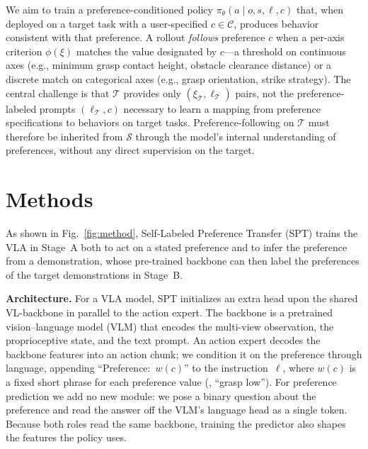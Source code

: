 \documentclass{article}
\begin{document}
We aim to train a preference-conditioned policy $\pi_{\theta}(a\mid o,s,\ell,c)$ that, when deployed on a target task with a user-specified $c\in\mathcal{C}$, produces behavior consistent with that preference.
A rollout \emph{follows} preference $c$ when a per-axis criterion $\phi(\xi)$ matches the value designated by $c$---a threshold on continuous axes (e.g., minimum grasp contact height, obstacle clearance distance) or a discrete match on categorical axes (e.g., grasp orientation, strike strategy).
The central challenge is that $\mathcal{T}$ provides only $(\xi_\mathcal{T},\ell_\mathcal{T})$ pairs, not the preference-labeled prompts $(\ell_\mathcal{T},c)$ necessary to learn a mapping from preference specifications to behaviors on target tasks.
Preference-following on $\mathcal{T}$ must therefore be inherited from $\mathcal{S}$ through the model's internal understanding of preferences, without any direct supervision on the target.




\section{Methods}
\label{sec:methods}



As shown in Fig.~\ref{fig:method}, Self-Labeled Preference Transfer (SPT) trains the VLA in Stage~A both to act on a stated preference and to infer the preference from a demonstration, whose pre-trained backbone can then label the preferences of the target demonstrations in Stage~B.


\textbf{Architecture.}
  For a VLA model, SPT initializes an extra head upon the shared VL-backbone in parallel to the action expert.
  The backbone is a pretrained vision--language model (VLM) that encodes the multi-view observation, the proprioceptive state, and the text prompt.
  An action expert decodes the backbone features into an action chunk;
  we condition it on the preference through language, appending ``Preference:~$w(c)$'' to the instruction~$\ell$, where $w(c)$ is a fixed short
  phrase for each preference value (\eg, ``grasp low'').
  For preference prediction we add no new module: we pose a binary question about the preference and read the answer off the VLM's language head as a single token.
  Because both roles read the same backbone, training the predictor also shapes the features the policy uses.
\end{document}
